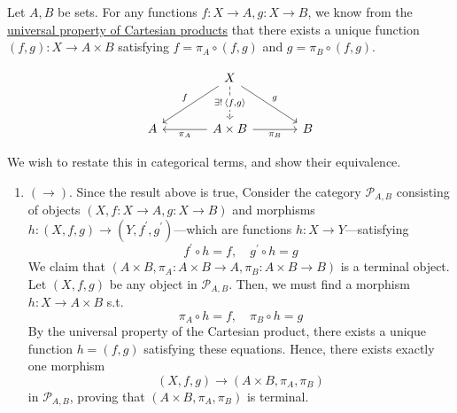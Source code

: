   \begin{example}
    \label{ex:cartesian-product-as-terminal-universal-object}
		Let $A, B$ be sets. For any functions $f: X \to A, g: X \to B$, we know from the \hyperref[st-thm:universal_cartesian]{universal property of Cartesian products} that there exists a unique function $(f, g): X \to A \times B$ satisfying $f = \pi_A \circ (f, g)$ and $g = \pi_B \circ (f, g)$. 
		
    \begin{equation}
      \begin{tikzcd}[column sep=large, row sep=large]
        & X \arrow[dl, "f"'] \arrow[dr, "g"]
            \arrow[d, dashed, "{\exists!\,\langle f,g\rangle}" description] & \\
        A & A\times B \arrow[l, "\pi_A"]
            \arrow[r, "\pi_B"'] & B
      \end{tikzcd}
    \end{equation}

		We wish to restate this in categorical terms, and show their equivalence. 

		\begin{enumerate}
		  \item $(\rightarrow)$. Since the result above is true, Consider the category $\mathcal{P}_{A, B}$ consisting of objects $(X, f: X \to A, g: X \to B)$ and morphisms $h: (X, f, g) \to (Y, f^\prime, g^\prime)$---which are functions $h: X \to Y$---satisfying 
				\begin{equation}
					f^\prime \circ h = f, \quad  g^\prime \circ h = g
				\end{equation}
				We claim that $(A \times B, \pi_A: A \times B \to A, \pi_B: A \times B \to B)$ is a terminal object. Let $(X, f, g)$ be any object in $\mathcal{P}_{A, B}$. Then, we must find a morphism $h: X \to A \times B$ s.t. 
				\begin{equation}
					\pi_A \circ h = f, \quad \pi_B \circ h = g
				\end{equation}
				By the universal property of the Cartesian product, there exists a unique function $h = (f,g)$ satisfying these equations. Hence, there exists exactly one morphism
				\begin{equation}
					(X,f,g) \to (A\times B,\pi_A,\pi_B)
				\end{equation}
				in $\mathcal P_{A,B}$, proving that $(A\times B,\pi_A,\pi_B)$ is terminal.


\end{enumerate}
\end{example}
